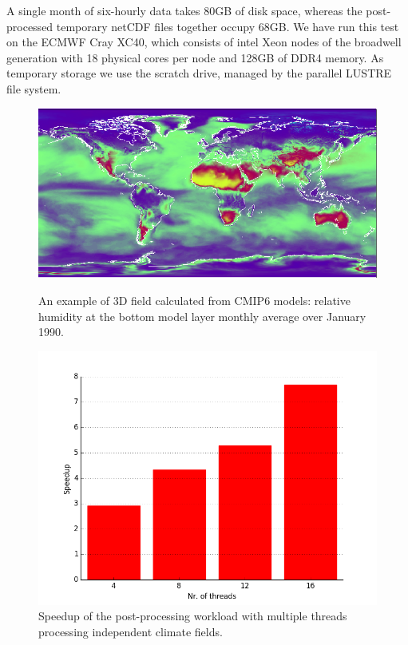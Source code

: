 \documentclass[procedia]{easychair}
\begin{document}
  A single month of 
six-hourly data takes 80GB of disk space, whereas the post-processed temporary  
netCDF files together occupy 68GB. We have run this test on the ECMWF Cray XC40, 
which consists of intel Xeon nodes of the broadwell generation with 18 physical 
cores per node and 128GB of DDR4 memory. As temporary storage we use the scratch 
drive, managed by the parallel LUSTRE file system.

\begin{figure}[h]
\centering
\begin{minipage}[b]{.45\textwidth}
  \centering
   \vspace*{1.5cm}
 \includegraphics[width=1\textwidth]{hur.png}
 \caption{An example of 3D field calculated from CMIP6 models: relative humidity at the bottom model 
   layer monthly average over January 1990.}
\label{fig:hum}
\end{minipage}%
\hspace{0.6cm}
\begin{minipage}[b]{.45\textwidth}
  \centering
 \includegraphics[width=1\textwidth]{speedup_chart.png}
  \vspace*{-0.75cm}
 \caption{Speedup of the post-processing workload with multiple threads 
processing independent climate fields.}
\label{fig:speedup}
\end{minipage}
\end{figure}
\end{document}
